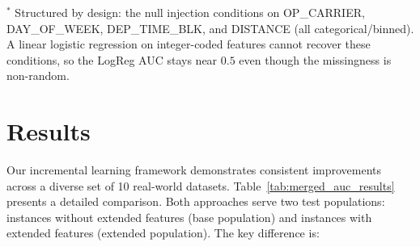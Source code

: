 \documentclass[sigconf]{acmart}
\begin{document}
\begin{itemize}
\begin{table}[h]
\centering
\caption{Missingness structure validation. Chi-squared tests whether label distribution differs by feature availability; LogReg AUC measures predictability of missingness from base features (0.5 = random).}
\label{tab:missingness}

\footnotesize
$^{*}$ Structured by design: the null injection conditions on
OP\_CARRIER, DAY\_OF\_WEEK, DEP\_TIME\_BLK, and DISTANCE (all
categorical/binned). A linear logistic regression on integer-coded
features cannot recover these conditions, so the LogReg AUC stays near
$0.5$ even though the missingness is non-random.
\end{table}

\section{Results}
\label{sec:results}

Our incremental learning framework demonstrates consistent improvements across a diverse set of 10 real-world datasets. Table~\ref{tab:merged_auc_results} presents a detailed comparison. Both approaches serve two test populations: instances without extended features (base population) and instances with extended features (extended population). The key difference is:


\end{itemize}
\end{document}
